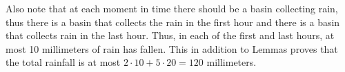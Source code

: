\begin{solution}
Also note that at each moment in time there should be a basin collecting rain, thus there is a basin that collects the rain in the first hour and there is a basin that collects rain in the last hour. Thus, in each of the first and last hours, at most 10 millimeters of rain has fallen. This in addition to Lemmas proves that the total rainfall is at most $2\cdot10+5\cdot20=120$ millimeters.
\end{solution}

